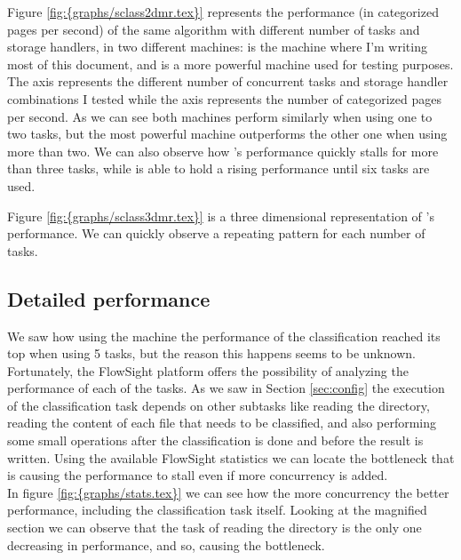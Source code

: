 
Figure \ref{fig:{graphs/sclass2dmr.tex}} represents the performance (in categorized pages per second) of the same algorithm with different number of tasks and storage handlers, in two different machines:  
is the machine where I'm writing most of this document, and  is a more powerful machine used for testing purposes. The  axis represents the 
different number of concurrent tasks and storage handler combinations I tested while the  axis represents the number of categorized pages per second.
As we can see both machines perform similarly when using one to two tasks, but the most powerful machine outperforms the other one when using more than two. We can also observe how 's performance
quickly stalls for more than three tasks, while  is able to hold a rising performance until six tasks are used.

Figure \ref{fig:{graphs/sclass3dmr.tex}} is a three dimensional representation of 's performance. We can quickly observe a repeating pattern for each number of tasks.

\subsection{Detailed performance}
We saw how using the  machine the performance of the classification reached its top when using 5 tasks, but the reason this happens seems to be unknown. 
Fortunately, the FlowSight platform offers the possibility of analyzing the performance of each of the tasks. As we saw in Section \ref{sec:config} the execution of the classification
task depends on other subtasks like reading the directory, reading the content of each file that needs to be classified, and also performing some small operations after the classification is done and before
the result is written. Using the available FlowSight statistics we can locate the bottleneck that is causing the performance to stall even if more concurrency is added. \\ 
In figure \ref{fig:{graphs/stats.tex}} we can see how the more concurrency the better performance, including the classification task itself. Looking at the magnified section we can observe
that the task of reading the directory is the only one decreasing in performance, and so, causing the bottleneck. 


